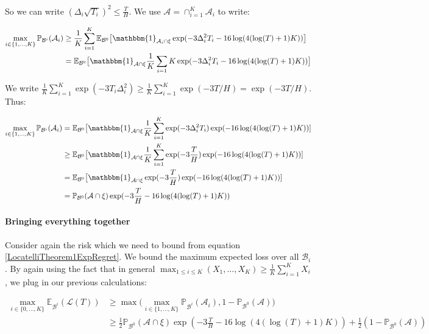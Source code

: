 \documentclass[12pt,]{article}
\let\oldparagraph\paragraph
\renewcommand{\paragraph}[1]{\oldparagraph{#1}\mbox{}}
\begin{document}
So we can write \((\Delta_i \sqrt{T_i})^2 \leq \frac{T}{H}\). We use
\(\mathcal{A} = \cap_{i=1}^K \mathcal{A}_i\) to write:

\begin{align*}
\max_{i \in \{1,\dots,K\}} \mathbb{P}_{\mathcal{B}^i}(\mathcal{A}_i) & \geq \frac{1}{K} \sum_{i=1}^{K} \mathbb{E}_{\mathcal{B}^0} \big[\mathbbm{1}_{\mathcal{A}_i \cap \xi} \exp (- 3 \Delta_i^2 T_i - 16 \log(4(\log(T)+1)K)) \big] \\
& = \mathbb{E}_{\mathcal{B}^0} \big[\mathbbm{1}_{\mathcal{A} \cap \xi} \frac{1}{K} \sum_{i=1}{K} \exp (- 3 \Delta_i^2 T_i - 16 \log(4(\log(T)+1)K)) \big]
\end{align*}

We write
\(\frac{1}{K} \sum_{i=1}^K \exp(-3T_i \Delta_i^2) \geq \frac{1}{K} \sum_{i=1}^K \exp(-3 T/H) = \exp(-3 T/H)\).
Thus:

\begin{align*}
\max_{i \in \{1,\dots,K\}} \mathbb{P}_{\mathcal{B}^i}(\mathcal{A}_i) & = \mathbb{E}_{\mathcal{B}^0} \big[\mathbbm{1}_{\mathcal{A} \cap \xi} \frac{1}{K} \sum_{i=1}^{K} \exp (- 3 \Delta_i^2 T_i) \exp(-16 \log(4(\log(T)+1)K)) ] \\
& \geq \mathbb{E}_{\mathcal{B}^0} \big[\mathbbm{1}_{\mathcal{A} \cap \xi} \frac{1}{K} \sum_{i=1}^{K} \exp (- 3 \frac{T}{H}) \exp(-16 \log(4(\log(T)+1)K)) ] \\
& = \mathbb{E}_{\mathcal{B}^0} \big[\mathbbm{1}_{\mathcal{A} \cap \xi} \exp (- 3 \frac{T}{H}) \exp(-16 \log(4(\log(T)+1)K)) ] \\
& = \mathbb{P}_{\mathcal{B}^0} (\mathcal{A} \cap \xi) \exp (- 3 \frac{T}{H} -16 \log(4(\log(T)+1)K))
\end{align*}

\paragraph{Bringing everything
together}\label{bringing-everything-together}

Consider again the risk which we need to bound from equation
\eqref{LocatelliTheorem1ExpRegret}. We bound the maximum expected loss
over all \(\mathcal{B}_i\). By again using the fact that in general
\(\max_{1 \leq i \leq K} (X_1, \dots, X_K) \geq \frac{1}{K} \sum_{i = 1}^K X_i\),
we plug in our previous calculations:

\begin{align}
\max_{i \in \{0, \dots, K\}} \mathbb{E}_{\mathcal{B}^i} (\mathcal{L}(T)) & \geq \max \big( \max_{i \in \{1, \dots, K\}} \mathbb{P}_{\mathcal{B}^i}(\mathcal{A}_i), 1 - \mathbb{P}_{\mathcal{B}^0}(\mathcal{A}) \big) \\
& \geq \frac{1}{2}\mathbb{P}_{\mathcal{B}^0} (\mathcal{A} \cap \xi) \exp (- 3 \frac{T}{H} -16 \log(4(\log(T)+1)K)) + \frac{1}{2}(1 - \mathbb{P}_{\mathcal{B}^0}(\mathcal{A})) \label{LocatelliTheorem1DefinitionOfRisk}
\end{align}
\end{document}

